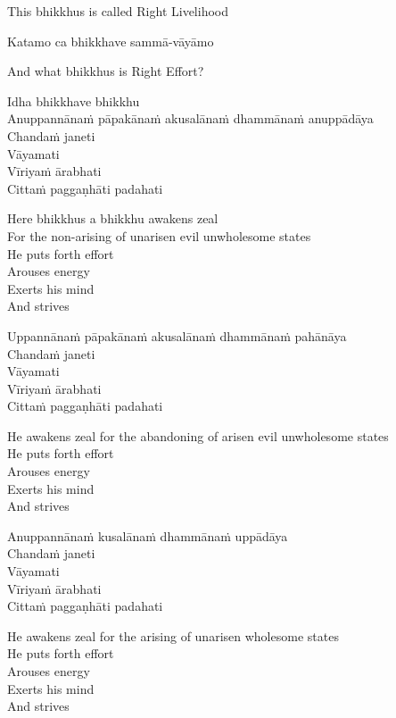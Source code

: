 \begin{cprenglish}
This bhikkhus is called Right Livelihood
\end{cprenglish}

Katamo ca bhikkhave sammā-vāyāmo

\begin{cprenglish}
And what bhikkhus is Right Effort?
\end{cprenglish}

Idha bhikkhave bhikkhu\\
Anuppannānaṁ pāpakānaṁ akusalānaṁ dhammānaṁ anuppādāya\\
Chandaṁ janeti\\
Vāyamati\\
Vīriyaṁ ārabhati\\
Cittaṁ paggaṇhāti padahati

\begin{cprenglish}
Here bhikkhus a bhikkhu awakens zeal\\
For the non-arising of unarisen evil unwholesome states\\
He puts forth effort\\
Arouses energy\\
Exerts his mind\\
And strives
\end{cprenglish}

Uppannānaṁ pāpakānaṁ akusalānaṁ dhammānaṁ pahānāya\\
Chandaṁ janeti\\
Vāyamati\\
Vīriyaṁ ārabhati\\
Cittaṁ paggaṇhāti padahati

\begin{cprenglish}
He awakens zeal for the abandoning of arisen evil unwholesome states\\
He puts forth effort\\
Arouses energy\\
Exerts his mind\\
And strives
\end{cprenglish}

Anuppannānaṁ kusalānaṁ dhammānaṁ uppādāya\\
Chandaṁ janeti\\
Vāyamati\\
Vīriyaṁ ārabhati\\
Cittaṁ paggaṇhāti padahati

\begin{cprenglish}
He awakens zeal for the arising of unarisen wholesome states\\
He puts forth effort\\
Arouses energy\\
Exerts his mind\\
And strives
\end{cprenglish}


